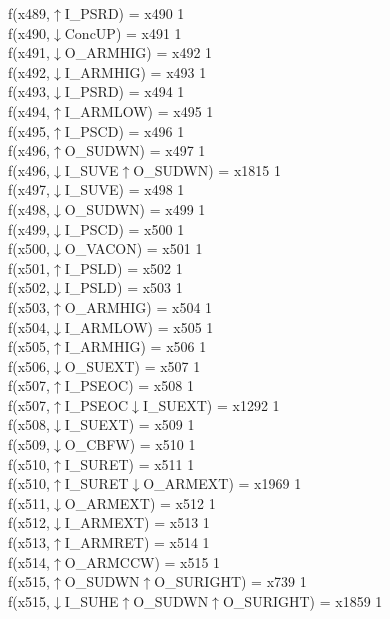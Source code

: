 f(x489,$\uparrow$I\_PSRD) = x490 {1} \\
f(x490,$\downarrow$ConcUP) = x491 {1} \\
f(x491,$\downarrow$O\_ARMHIG) = x492 {1} \\
f(x492,$\downarrow$I\_ARMHIG) = x493 {1} \\
f(x493,$\downarrow$I\_PSRD) = x494 {1} \\
f(x494,$\uparrow$I\_ARMLOW) = x495 {1} \\
f(x495,$\uparrow$I\_PSCD) = x496 {1} \\
f(x496,$\uparrow$O\_SUDWN) = x497 {1} \\
f(x496,$\downarrow$I\_SUVE$\uparrow$O\_SUDWN) = x1815 {1} \\
f(x497,$\downarrow$I\_SUVE) = x498 {1} \\
f(x498,$\downarrow$O\_SUDWN) = x499 {1} \\
f(x499,$\downarrow$I\_PSCD) = x500 {1} \\
f(x500,$\downarrow$O\_VACON) = x501 {1} \\
f(x501,$\uparrow$I\_PSLD) = x502 {1} \\
f(x502,$\downarrow$I\_PSLD) = x503 {1} \\
f(x503,$\uparrow$O\_ARMHIG) = x504 {1} \\
f(x504,$\downarrow$I\_ARMLOW) = x505 {1} \\
f(x505,$\uparrow$I\_ARMHIG) = x506 {1} \\
f(x506,$\downarrow$O\_SUEXT) = x507 {1} \\
f(x507,$\uparrow$I\_PSEOC) = x508 {1} \\
f(x507,$\uparrow$I\_PSEOC$\downarrow$I\_SUEXT) = x1292 {1} \\
f(x508,$\downarrow$I\_SUEXT) = x509 {1} \\
f(x509,$\downarrow$O\_CBFW) = x510 {1} \\
f(x510,$\uparrow$I\_SURET) = x511 {1} \\
f(x510,$\uparrow$I\_SURET$\downarrow$O\_ARMEXT) = x1969 {1} \\
f(x511,$\downarrow$O\_ARMEXT) = x512 {1} \\
f(x512,$\downarrow$I\_ARMEXT) = x513 {1} \\
f(x513,$\uparrow$I\_ARMRET) = x514 {1} \\
f(x514,$\uparrow$O\_ARMCCW) = x515 {1} \\
f(x515,$\uparrow$O\_SUDWN$\uparrow$O\_SURIGHT) = x739 {1} \\
f(x515,$\downarrow$I\_SUHE$\uparrow$O\_SUDWN$\uparrow$O\_SURIGHT) = x1859 {1} \\
